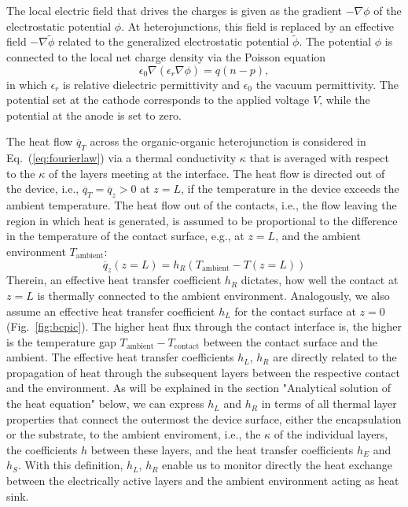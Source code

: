 \documentclass[%
9pt,
 aip,
rsi,%
 amsmath,amssymb,
preprint,%
]{revtex4-1}
\begin{document}
The local electric field that drives the charges is given as the gradient $-\nabla\phi$ of the electrostatic potential $\phi$. 
At heterojunctions, this field is replaced by an effective field $-\nabla\tilde{\phi}$ related to the generalized electrostatic potential $\tilde{\phi}$. 
The potential $\phi$ is connected to the local net charge density via the Poisson equation 
\begin{equation}
    \epsilon_0 \nabla \left( \epsilon_r \nabla \phi \right) = q \left(n-p\right), \label{eq:poisson}
\end{equation}
in which $\epsilon_r$ is relative dielectric permittivity and $\epsilon_0$ the vacuum permittivity.
The potential set at the cathode corresponds to the applied voltage $V$, while the potential at the anode is set to zero. 

The heat flow $\overline{q}_T$ across the organic-organic heterojunction is considered in Eq.~(\ref{eq:fourierlaw}) via a thermal conductivity $\kappa$ that is averaged with respect to the $\kappa$ of the layers meeting at the interface.
The heat flow is directed out of the device, i.e., $\overline{q}_T = \overline{q}_z > 0$ at $z=L$,  if the temperature in the device exceeds the ambient temperature.
The heat flow out of the contacts, i.e., the flow leaving the region in which heat is generated, is assumed to be proportional to the difference in the temperature of the contact surface, e.g., at $z=L$, and the ambient environment $T_{\mathrm{ambient}}$:
\begin{equation}
	\label{eq:bcheatflux}
	\overline{q}_z\left(z=L\right)=h_{R}\left(T_{\mathrm{ambient}}-T\left(z=L\right)\right)
\end{equation}
Therein, an effective heat transfer coefficient $h_R$ dictates, how well the contact at $z=L$ is thermally connected to the ambient environment. 
Analogously, we also assume an effective heat transfer coefficient $h_L$ for the contact surface at $z=0$ (Fig.~\ref{fig:bcpic}).
The higher heat flux through the contact interface is, the higher is the temperature gap $T_{\mathrm{ambient}}-T_{\mathrm{contact}}$ between the contact surface and the ambient.
The effective heat transfer coefficients $h_L$, $h_R$ are directly related to the propagation of heat through the subsequent layers between the respective contact and the environment. As will be explained in the section "Analytical solution of the heat equation" below, we can express $h_{L}$ and $h_{R}$ in terms of all thermal layer properties that connect the outermost the device surface, either the encapsulation or the substrate, to the ambient enviroment, i.e., the $\kappa$ of the individual layers, the coefficients $h$ between these layers, and the heat transfer coefficients $h_{E}$ and $h_{S}$.
With this definition, $h_L$, $h_R$ enable us to monitor directly the heat exchange between the electrically active layers and the ambient environment acting as heat sink.
\end{document}
